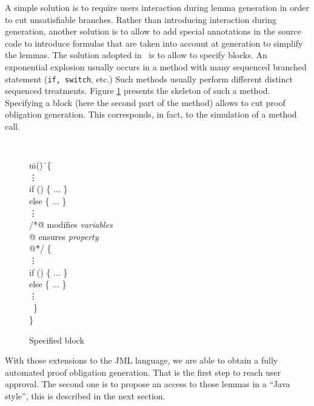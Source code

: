  A simple solution is to require users interaction during lemma
 generation in order to cut unsatisfiable branches.  Rather than introducing
 interaction during generation, another solution is to allow to add
 special annotations in the source code to introduce formulas that are
 taken into account at generation to simplify the lemmas.
 The solution adopted in \JACK\ is to allow to specify blocks. An exponential explosion usually occurs
in a method with many sequenced branched statement ({\tt if, switch}, etc.) Such methods usually perform
different distinct sequenced treatments.
 Figure \ref{Specified_block} presents the skeleton of such a method. Specifying a block (here the second part
of the method) allows to cut proof obligation generation. This corresponds, in fact, to the simulation of a
method call.
\begin{figure}[htp]
{\tt
\begin{tabbing}
 \hspace{3 cm} \=m()\= \ \{ \\
 \> \> \vdots \\
 \> \> if () \{ $\hdots$ \} \\
 \> \> else \{ $\hdots$ \}   \\
 \> \> \vdots                   \\
 \> \> /*\=@ modifies {\it variables}  \\
 \> \> \> @ ensures {\it property} \\
 \> \> \> @\=*/ \{ \\
 \> \> \> \> \vdots \\
 \> \> \> \> if () \{ $\hdots$ \} \\
 \> \> \> \> else \{ $\hdots$ \}   \\
 \> \> \> \> \vdots                   \\
 \> \> \ \} \\
 \> \> \}
\end{tabbing}
}
 \caption{\sc Specified block}
 \label{Specified_block}
\end{figure}

 With those extensions to the JML language, we are able to obtain a fully automated proof obligation generation.
That is the first step to reach user approval. The second one is to propose an access to those lemmas in a
``Java style'', this is described in the next section.
